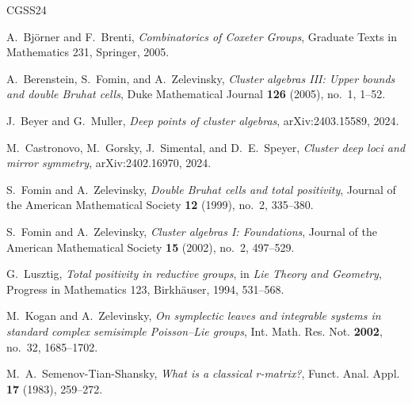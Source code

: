 \documentclass[12pt]{amsart}
\theoremstyle{plain}
\theoremstyle{definition}
\theoremstyle{remark}
\begin{document}
\begin{thebibliography}{CGSS24}

A.~Bj\"orner and F.~Brenti,
\emph{Combinatorics of Coxeter Groups},
Graduate Texts in Mathematics 231, Springer, 2005.

A.~Berenstein, S.~Fomin, and A.~Zelevinsky,
\emph{Cluster algebras III: Upper bounds and double Bruhat cells},
Duke Mathematical Journal \textbf{126} (2005), no.~1, 1--52.

J.~Beyer and G.~Muller,
\emph{Deep points of cluster algebras},
arXiv:2403.15589, 2024.

M.~Castronovo, M.~Gorsky, J.~Simental, and D.~E.~Speyer,
\emph{Cluster deep loci and mirror symmetry},
arXiv:2402.16970, 2024.

S.~Fomin and A.~Zelevinsky,
\emph{Double Bruhat cells and total positivity},
Journal of the American Mathematical Society \textbf{12} (1999), no.~2, 335--380.

S.~Fomin and A.~Zelevinsky,
\emph{Cluster algebras I: Foundations},
Journal of the American Mathematical Society \textbf{15} (2002), no.~2, 497--529.

G.~Lusztig,
\emph{Total positivity in reductive groups},
in \emph{Lie Theory and Geometry}, Progress in Mathematics 123, Birkh\"auser, 1994, 531--568.

M.~Kogan and A.~Zelevinsky,
\emph{On symplectic leaves and integrable systems in standard complex
semisimple Poisson--Lie groups},
Int. Math. Res. Not. \textbf{2002}, no.~32, 1685--1702.

M.~A.~Semenov-Tian-Shansky,
\emph{What is a classical r-matrix?},
Funct. Anal. Appl. \textbf{17} (1983), 259--272.

\end{thebibliography}
\end{document}
